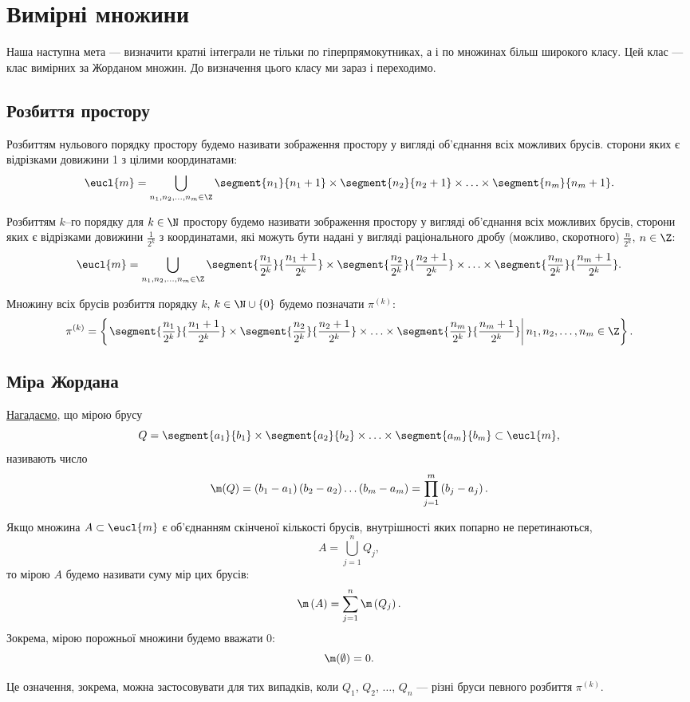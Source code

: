 \section{Вимірні множини}\label{part:measure}

Наша наступна мета --- визначити кратні інтеграли не тільки по гіперпрямокутниках, а і по множинах більш широкого класу. Цей клас --- клас вимірних за Жорданом множин. До визначення цього класу ми зараз і переходимо.
\subsection{Розбиття простору }
\begin{definition}
Розбиттям нульового порядку простору  будемо називати зображення простору  у вигляді об'єднання всіх можливих брусів. сторони яких є відрізками довижини 1 з цілими координатами:
\[
\eucl{m} = \bigcup\limits_{n_1, n_2, \ldots, n_m\in\Z}\segment{n_1}{n_1+1}\times\segment{n_2}{n_2+1}\times\ldots\times\segment{n_m}{n_m+1}.
\]
\end{definition}
\begin{definition}
Розбиттям $k$--го порядку для ${k\in\N}$ простору  будемо називати зображення простору  у вигляді об'єднання всіх можливих брусів, сторони яких є відрізками довижини ${\frac{1}{2^k}}$ з координатами, які можуть бути надані у вигляді раціонального дробу (можливо, скоротного) ${\frac{n}{2^k}}$, ${n\in\Z}$:
\[
\eucl{m} = \bigcup\limits_{n_1, n_2, \ldots, n_m\in\Z}\segment{\frac{n_1}{2^k}}{\frac{n_1+1}{2^k}}\times\segment{\frac{n_2}{2^k}}{\frac{n_2+1}{2^k}}\times\ldots\times\segment{\frac{n_m}{2^k}}{\frac{n_m+1}{2^k}}.
\]
\end{definition}
Множину всіх брусів розбиття порядку $k$, ${k\in\N\cup\{0\}}$ будемо позначати ${\pi^{(k)}}$:
\[
\pi^{(k)} =
\left\{
\left.
\segment{\frac{n_1}{2^k}}{\frac{n_1+1}{2^k}}\times\segment{\frac{n_2}{2^k}}{\frac{n_2+1}{2^k}}\times\ldots\times\segment{\frac{n_m}{2^k}}{\frac{n_m+1}{2^k}}
\right| n_1, n_2, \ldots, n_m\in\Z
\right\}.
\]
\subsection{Міра Жордана}
\hyperref[def:box]{Нагадаємо}, що мірою брусу
\[
Q = \segment{a_1}{b_1}\times\segment{a_2}{b_2}\times\ldots\times\segment{a_m}{b_m} \subset \eucl{m},
\]
називають число
\[
\m(Q) = \left(b_1-a_1\right)\left(b_2 - a_2\right)\ldots\left(b_m-a_m\right) = \prod\limits_{j=1}^{m}\left(b_j - a_j\right).
\]
\begin{definition}
Якщо множина ${A\subset\eucl{m}}$ є об'єднанням скінченої кількості брусів, внутрішності яких попарно не перетинаються,
\[
A = \bigcup\limits_{j=1}^nQ_j,
\]
то мірою $A$ будемо називати суму мір цих брусів:
\[
\m\left(A\right) = \sum\limits_{j=1}^n\m\left(Q_j\right).
\]
Зокрема, мірою порожньої множини будемо вважати 0:
\[
\m(\emptyset) = 0.
\]
\end{definition}
Це означення, зокрема, можна застосовувати для тих випадків, коли ${Q_1}$, ${Q_2}$, ${\ldots}$, ${Q_n}$ --- різні бруси певного розбиття ${\pi^{(k)}}$.

